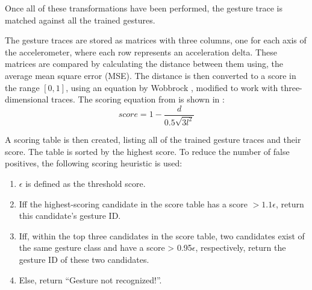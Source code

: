 Once all of these transformations have been performed, 
the gesture trace is matched against all the trained gestures. 

The gesture traces are stored as matrices with three columns, 
one for each axis of the accelerometer, 
where each row represents an acceleration delta.
These matrices are compared by calculating the distance between them using, 
the average mean square error (MSE).
The distance is then converted to a score in the range $[0,1]$, 
using an equation by Wobbrock \etal, 
modified to work with three-dimensional traces.
The scoring equation from \cite{threedollar} is shown in :
\begin{equation}\label{eq:gesture-scoring}
    score = 1-\frac{d}{0.5\sqrt{3l^2}}
\end{equation}

A scoring table is then created, 
listing all of the trained gesture traces and their score. 
The table is sorted by the highest score.
To reduce the number of false positives, 
the following scoring heuristic is used:

\begin{enumerate}
	\item {$\epsilon$ is defined as the threshold score.}
	\item {Iff the highest-scoring candidate in the score table has a score $> 1.1\epsilon$, return this candidate’s gesture ID.}
	\item {Iff, within the top three candidates in the score table, two candidates exist of the same gesture class and have a score > 0.95$\epsilon$, respectively, return the gesture ID of these two candidates.}
	\item {Else, return ``Gesture not recognized!''.}
\end{enumerate}

